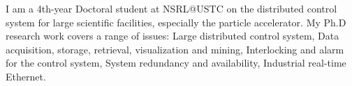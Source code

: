 

I am a 4th-year Doctoral student at NSRL@USTC on the distributed control system for large scientific facilities, especially the particle accelerator. My Ph.D research work covers a range of issues: Large distributed control system, Data acquisition, storage, retrieval,  visualization and mining, Interlocking and alarm for the control system, System redundancy and availability, Industrial real-time Ethernet.


